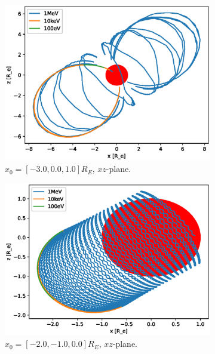 \begin{figure}
\begin{subfigure}[h]{0.45\textwidth}
        \includegraphics[width=\textwidth]{Figures/Trajectories/trajectories-xz-56.eps}
        \caption{$x_0 = [-3.0,0.0,1.0]R_E$, $xz$-plane.}
        \label{fig:traj-e}
    \end{subfigure}
    \hfill
    \begin{subfigure}[h]{0.45\textwidth}
        \includegraphics[width=\textwidth]{Figures/Trajectories/trajectories-xz-11.eps}
        \caption{$x_0 = [-2.0,-1.0,0.0]R_E$, $xz$-plane.}
        \label{fig:traj-f}
    \end{subfigure}
    \vfill
    \begin{subfigure}[h]{0.45\textwidth}

\end{subfigure}
\end{figure}
